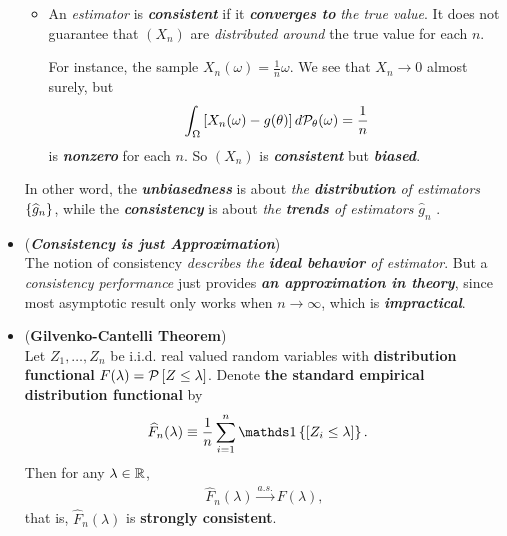 \documentclass[11pt]{article}
\begin{document}
\begin{itemize}
\begin{remark}
\begin{itemize}
\item An \emph{estimator} is \emph{\textbf{consistent}} if it  \emph{\textbf{converges to}} \emph{the true value}. It does not guarantee that $(X_n)$ are \emph{distributed around} the true value for each $n$. 

For instance, the sample $X_n(\omega) = \frac{1}{n}\omega$. We see that $X_n \rightarrow 0$ almost surely, but 
\begin{align*}
\int_{\Omega} \left[X_n(\omega)  - g(\theta)\right] d{\mathcal P}_{\theta}(\omega) = \frac{1}{n}
\end{align*} is \emph{\textbf{nonzero}} for each $n$. So $(X_n)$ is \emph{\textbf{consistent}} but \emph{\textbf{biased}}.
\end{itemize}

In other word, the \emph{\textbf{unbiasedness}} is about \emph{the \textbf{distribution} of estimators} $\left\{\widehat{g}_n\right\}$, while the \emph{\textbf{consistency}} is about \emph{the \textbf{trends} of estimators} $\widehat{g}_n$ .
\end{remark}


\item \begin{remark} (\emph{\textbf{Consistency is just Approximation}})\\
The notion of consistency \emph{describes the \textbf{ideal behavior} of estimator}. But a \emph{consistency performance} just provides \emph{\textbf{an approximation in theory}}, since most asymptotic result only works when  $n\rightarrow \infty$, which is \emph{\textbf{impractical}}. 
\end{remark}

\item \begin{theorem}(\textbf{Gilvenko-Cantelli Theorem})\citep{devroye2013probabilistic, resnick2013probability}\\
Let $Z_{1}, \ldots, Z_{n}$ be i.i.d. real valued random variables with \textbf{distribution functional} $F(\lambda) = {\mathcal P}\left[Z\le \lambda\right]$. Denote \textbf{the standard empirical distribution functional} by 
\begin{align*}
\widehat{F}_{n}(\lambda) &\equiv \frac{1}{n}\sum_{i=1}^{n}\ind{\brac{Z_{i}\le \lambda}}. 
\end{align*}
Then  for any $\lambda\in {\mathbb R}$, 
\begin{align*}
\widehat{F}_{n}(\lambda)\stackrel{a.s.}{\rightarrow} F(\lambda),
\end{align*}
that is, $\widehat{F}_{n}(\lambda)$ is \textbf{strongly consistent}. 
\end{theorem}


\end{itemize}
\end{document}

